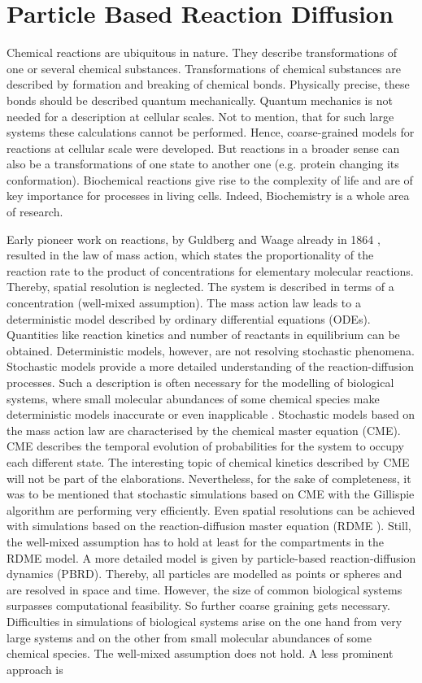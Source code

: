 \documentclass[
  a4paper,BCOR10mm,twoside,
  headsepline,footsepline,%
  fleqn,openbib
]{scrbook}
\begin{document}
\chapter{Particle Based Reaction Diffusion }
Chemical reactions are ubiquitous in nature. They describe transformations of one or several chemical substances. Transformations of chemical substances are described by formation and breaking of chemical bonds. Physically precise, these bonds should be described quantum mechanically. Quantum mechanics is not needed for a description at cellular scales. Not to mention, that for such large systems these calculations cannot be performed. Hence, coarse-grained models for reactions at cellular scale were developed. But reactions in a broader sense can also be a transformations of one state to another one (e.g. protein changing its conformation). Biochemical reactions give rise to the complexity of life and are of key importance for processes in living cells. Indeed, Biochemistry is a whole area of research.\par Early pioneer work on reactions, by Guldberg and Waage already in 1864 \cite{Waage1986}, resulted in the law of mass action, which states the proportionality of the reaction rate to the product of concentrations for elementary molecular reactions. Thereby, spatial resolution is neglected. The system is described in terms of a concentration (well-mixed assumption). The mass action law leads to a deterministic model described by ordinary differential equations (ODEs). Quantities like reaction kinetics and number of reactants in equilibrium can be obtained. Deterministic models, however, are not resolving stochastic phenomena. Stochastic models provide a more detailed understanding of the reaction-diffusion processes. Such a description is often necessary for the modelling of biological systems, where small molecular abundances of some chemical species make deterministic models inaccurate or even inapplicable \cite{0704.1908}. Stochastic models based on the mass action law are characterised by the chemical master equation (CME). CME describes the temporal evolution of probabilities for the system to occupy each different state. The interesting topic of chemical kinetics described by CME will not be part of the elaborations. Nevertheless, for the sake of completeness, it was to be mentioned that stochastic simulations based on CME with the Gillispie algorithm \cite{Gillespie1977} are performing very efficiently. Even spatial resolutions can be achieved with simulations based on the reaction-diffusion master equation (RDME \cite{Winkelmann2016}). Still, the well-mixed assumption has to hold at least for the compartments in the RDME model. A more detailed model is given by particle-based reaction-diffusion dynamics (PBRD)\cite{Schneberg2014,Gruenert2010}. Thereby, all particles are modelled as points or spheres and are resolved in space and time. However, the size  of common biological systems surpasses computational feasibility. So further coarse graining gets necessary. Difficulties in simulations of biological systems arise on the one hand from very large systems and on the other from small molecular abundances of some chemical species. The well-mixed assumption does not hold.  A less prominent approach is 
\end{document}
